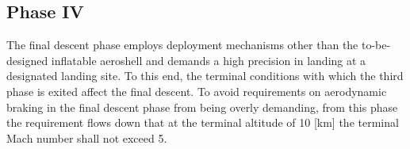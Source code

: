 \subsection{Phase IV}\label{sec:p4}
The final descent phase employs deployment mechanisms other than the to-be-designed inflatable aeroshell and demands a high precision in landing at a designated landing site. To this end, the terminal conditions with which the third phase is exited affect the final descent. To avoid requirements on aerodynamic braking in the final descent phase from being overly demanding, from this phase the requirement flows down that at the terminal altitude of 10 [km] the terminal Mach number shall not exceed 5. 

